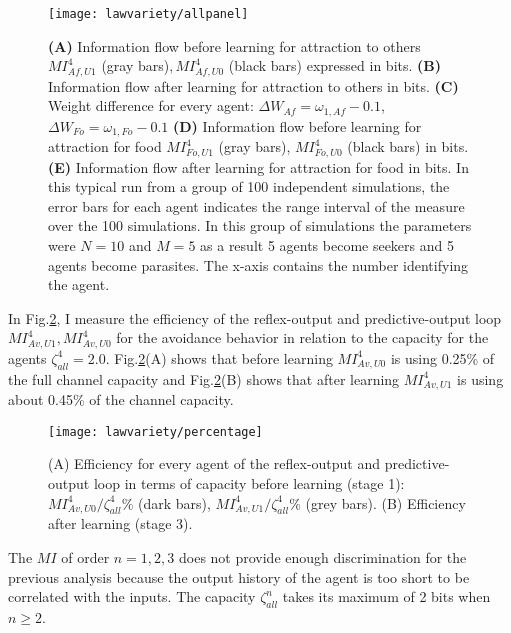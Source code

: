 \begin{figure}
\begin{center}
\texttt{[image: lawvariety/allpanel]}
\begin{small}
\caption[Information flow before and after learning]{
\textbf{(A)} Information flow before learning for attraction to others $MI^4_{Af,U1}$ (gray bars)$,MI^4_{Af,U0}$ (black bars)
expressed in bits.
\textbf{(B)} Information flow after learning for attraction to others in bits.
\textbf{(C)} Weight difference for every agent: $\Delta W_{Af}=\omega_{1,Af}-0.1$, $\Delta W_{Fo}=\omega_{1,Fo}-0.1$
\textbf{(D)} Information flow before learning for attraction for food $MI^4_{Fo,U1}$ (gray bars), $MI^4_{Fo,U0}$ (black bars) in bits.
\textbf{(E)} Information flow after learning for attraction for food in bits.
In this typical run from a group of 100 independent simulations, the error bars for each agent indicates the range interval of the measure over the 100 simulations.
In this group of simulations the parameters were $N=10$ and $M=5$ as a result 5 agents become seekers and 5 agents become parasites. The x-axis contains the number identifying the agent.
\label{fig:summary}}
\end{small}
\end{center}
\end{figure}

In Fig.\ref{fig:Cmax}, I measure the efficiency of the reflex-output and predictive-output 
loop $MI^4_{Av,U1},MI^4_{Av,U0}$ for the avoidance behavior in relation to the capacity 
for the agents $\zeta^4_{all}=2.0$. Fig.\ref{fig:Cmax}(A) shows
that before learning $MI^4_{Av,U0}$ is using 0.25\% of the full channel capacity and 
Fig.\ref{fig:Cmax}(B) shows that after learning $MI^4_{Av,U1}$ is using about 0.45\% of the channel capacity.
\begin{figure}
\begin{center}
\texttt{[image: lawvariety/percentage]}
\caption[Information flow and capacity]{
(A) Efficiency for every agent of the reflex-output and predictive-output loop
 in terms of capacity before learning (stage 1):
$MI^4_{Av,U0}/\zeta^4_{all} \%$ (dark bars),
$MI^4_{Av,U1}/\zeta^4_{all}\%$ (grey bars).
(B) Efficiency after learning (stage 3).  \label{fig:Cmax}}
\end{center}
\end{figure}
The $MI$ of order $n=1,2,3$ does not provide enough discrimination for the previous
analysis because the output history of the agent is too short to be correlated with the inputs.
The capacity $\zeta^n_{all}$ takes its maximum of 2 bits when $n \geq 2$.
